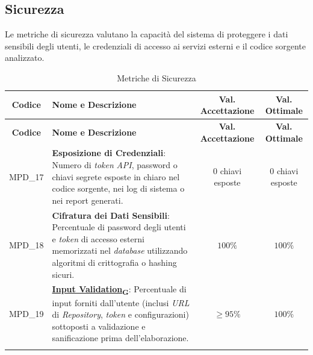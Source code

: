 \documentclass[12pt, a4paper]{article}
\newcommand{\urlglossario}{https://skynetunigroup.github.io/Code_Guardian/Documentazione/PB/glossario_v2.0.0.pdf} %
\newcommand{\glo}[2]{\href{\urlglossario\#nameddest=#2}{#1\textsubscript{G}}}
\newlength{\LargColVal} %
\begin{document}
\subsection{Sicurezza}
Le metriche di sicurezza valutano la capacità del sistema di proteggere i dati sensibili degli utenti, le credenziali di accesso ai servizi esterni e il codice sorgente analizzato.
\renewcommand{\arraystretch}{1.3}
\begin{xltabular}{\textwidth}{|c|X|C{\LargColVal}|C{\LargColVal}|}

    \hline
    \textbf{Codice} & \textbf{Nome e Descrizione} & \textbf{Val. Accettazione} & \textbf{Val. Ottimale} \\ \hline
    \endfirsthead

    \hline
    \textbf{Codice} & \textbf{Nome e Descrizione} & \textbf{Val. Accettazione} & \textbf{Val. Ottimale} \\ \hline
    \endhead

    MPD\_17 & \textbf{Esposizione di Credenziali}: Numero di \textit{token} \textit{API}, password o chiavi segrete esposte in chiaro nel codice sorgente, nei log di sistema o nei report generati. & $0$ chiavi esposte & $0$ chiavi esposte \\ \hline
    MPD\_18 & \textbf{Cifratura dei Dati Sensibili}: Percentuale di password degli utenti e \textit{token} di accesso esterni memorizzati nel \textit{database} utilizzando algoritmi di crittografia o hashing sicuri. & $100\%$ & $100\%$ \\ \hline
    MPD\_19 & \textbf{\glo{Input Validation}{input-validation}}: Percentuale di input forniti dall'utente (inclusi \textit{URL} di \textit{Repository}, \textit{token} e configurazioni) sottoposti a validazione e sanificazione prima dell'elaborazione. & $\ge 95\%$ & $100\%$ \\ \hline

    \caption{Metriche di Sicurezza}
    \label{tab:prod_sicurezza}
\end{xltabular}

\newpage

\newpage
\end{document}
